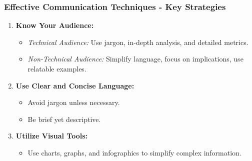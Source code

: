 \documentclass{beamer}
\begin{document}
\begin{frame}[fragile]
    \frametitle{Effective Communication Techniques - Key Strategies}
    \begin{enumerate}
        \item \textbf{Know Your Audience:}
        \begin{itemize}
            \item \textit{Technical Audience:} Use jargon, in-depth analysis, and detailed metrics.
            \item \textit{Non-Technical Audience:} Simplify language, focus on implications, use relatable examples.
        \end{itemize}

        \item \textbf{Use Clear and Concise Language:} 
        \begin{itemize}
            \item Avoid jargon unless necessary.
            \item Be brief yet descriptive.
        \end{itemize}

        \item \textbf{Utilize Visual Tools:}
        \begin{itemize}
            \item Use charts, graphs, and infographics to simplify complex information.
        \end{itemize}
    \end{enumerate}
\end{frame}
\end{document}
